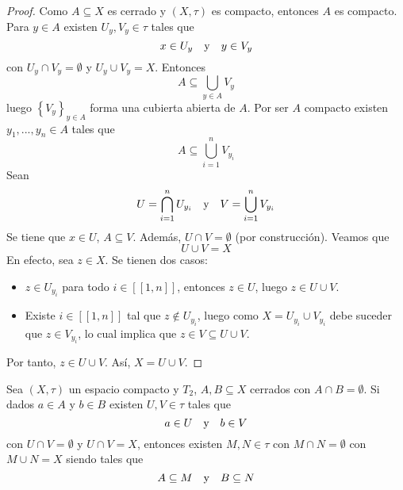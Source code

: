 \documentclass[12pt]{report}
\theoremstyle{largebreak}
\newcommand{\natint}[1]{\ensuremath{\left[\!\left[#1\right]\!\right]}}
\begin{document}
    \begin{proof}
        Como $A\subseteq X$ es cerrado y $(X,\tau)$ es compacto, entonces $A$ es compacto. Para $y\in A$ existen $U_y,V_y\in\tau$ tales que
        \begin{equation*}
            x\in U_y\quad\textup{y}\quad y\in V_y
        \end{equation*}
        con $U_y\cap V_y=\emptyset$ y $U_y\cup V_y=X$. Entonces
        \begin{equation*}
            A\subseteq\bigcup_{ y\in A}V_y
        \end{equation*}
        luego $\left\{V_y\right\}_{ y\in A}$ forma una cubierta abierta de $A$. Por ser $A$ compacto existen $y_1,...,y_n\in A$ tales que 
        \begin{equation*}
            A\subseteq \bigcup_{ i=1}^n V_{ y_i}
        \end{equation*}
        Sean
        \begin{equation*}
            U=\bigcap_{ i=1}^n U_{ y_i}\quad\textup{y}\quad V=\bigcup_{ i=1}^n V_{ y_i}
        \end{equation*}
        Se tiene que $x\in U$, $A\subseteq V$. Además, $U\cap V=\emptyset$ (por construcción). Veamos que
        \begin{equation*}
            U\cup V=X
        \end{equation*}
        En efecto, sea $z\in X$. Se tienen dos casos:
        \begin{itemize}
            \item $z\in U_{ y_i}$ para todo $i\in\natint{1,n}$, entonces $z\in U$, luego $z\in U\cup V$.
            \item Existe $i\in\natint{1,n}$ tal que $z\notin U_{ y_i}$, luego como $X=U_{ y_i}\cup V_{ y_i}$ debe suceder que $z\in V_{ y_i}$, lo cual implica que $z\in V\subseteq U\cup V$. 
        \end{itemize}
        Por tanto, $z\in U\cup V$. Así, $X=U\cup V$.
    \end{proof}

    \begin{lema}
        Sea $(X,\tau)$ un espacio compacto y $T_2$, $A,B\subseteq X$ cerrados con $A\cap B=\emptyset$. Si dados $a\in A$ y $b\in B$ existen $U,V\in\tau$ tales que
        \begin{equation*}
            a\in U\quad\textup{y}\quad b\in V
        \end{equation*}
        con $U\cap V=\emptyset$ y $U\cap V=X$, entonces existen $M,N\in\tau$ con $M\cap N=\emptyset$ con $M\cup N=X$ siendo tales que
        \begin{equation*}
            A\subseteq M\quad\textup{y}\quad B\subseteq N
        \end{equation*}
    \end{lema}
\end{document}

